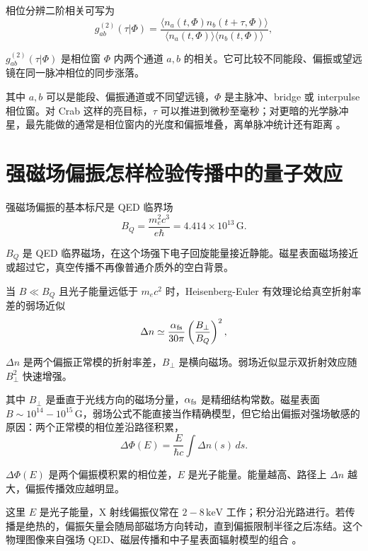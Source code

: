 相位分辨二阶相关可写为
\begin{equation}
  g^{(2)}_{ab}(\tau|\Phi)=
  \frac{\langle n_a(t,\Phi)n_b(t+\tau,\Phi)\rangle}
  {\langle n_a(t,\Phi)\rangle\langle n_b(t,\Phi)\rangle},
  \label{eq:ch11-16}
\end{equation}
\begin{formulaexplain}
\(g^{(2)}_{ab}(\tau|\Phi)\) 是相位窗 \(\Phi\) 内两个通道 \(a,b\) 的相关。它可比较不同能段、偏振或望远镜在同一脉冲相位的同步涨落。
\end{formulaexplain}
其中 \(a,b\) 可以是能段、偏振通道或不同望远镜，\(\Phi\) 是主脉冲、bridge 或 interpulse 相位窗。对 Crab 这样的亮目标，\(\tau\) 可以推进到微秒至毫秒；对更暗的光学脉冲星，最先能做的通常是相位窗内的光度和偏振堆叠，离单脉冲统计还有距离 \citep{1996ApJ...468..779M,2000ApJ...537..861S,2009MNRAS.397..103S}。

\section{强磁场偏振怎样检验传播中的量子效应}

强磁场偏振的基本标尺是 QED 临界场
\begin{equation}
  B_Q=\frac{m_e^2c^3}{e\hbar}
  =4.414\times10^{13}\,\mathrm{G}.
  \label{eq:ch11-17}
\end{equation}
\begin{formulaexplain}
\(B_Q\) 是 QED 临界磁场，在这个场强下电子回旋能量接近静能。磁星表面磁场接近或超过它，真空传播不再像普通介质外的空白背景。
\end{formulaexplain}
当 \(B\ll B_Q\) 且光子能量远低于 \(m_ec^2\) 时，Heisenberg-Euler 有效理论给真空折射率差的弱场近似
\begin{equation}
  \Delta n \simeq
  \frac{\alpha_{\rm fs}}{30\pi}
  \left(\frac{B_\perp}{B_Q}\right)^2 ,
  \label{eq:ch11-18}
\end{equation}
\begin{formulaexplain}
\(\Delta n\) 是两个偏振正常模的折射率差，\(B_\perp\) 是横向磁场。弱场近似显示双折射效应随 \(B_\perp^2\) 快速增强。
\end{formulaexplain}
其中 \(B_\perp\) 是垂直于光线方向的磁场分量，\(\alpha_{\rm fs}\) 是精细结构常数。磁星表面 \(B\sim10^{14}-10^{15}\,\mathrm{G}\)，弱场公式不能直接当作精确模型，但它给出偏振对强场敏感的原因：两个正常模的相位差沿路径积累，
\begin{equation}
  \Delta \Phi(E)=\frac{E}{\hbar c}\int \Delta n(s)\,ds .
  \label{eq:ch11-19}
\end{equation}
\begin{formulaexplain}
\(\Delta\Phi(E)\) 是两个偏振模积累的相位差，\(E\) 是光子能量。能量越高、路径上 \(\Delta n\) 越大，偏振传播效应越明显。
\end{formulaexplain}
这里 \(E\) 是光子能量，X 射线偏振仪常在 \(2-8\,\mathrm{keV}\) 工作；积分沿光路进行。若传播是绝热的，偏振矢量会随局部磁场方向转动，直到偏振限制半径之后冻结。这个物理图像来自强场 QED、磁层传播和中子星表面辐射模型的组合 \citep{1936ZPhy...98..714H,1971AnPhy..67..599A,2000MNRAS.311..555H,2002PhRvD..66b3002H,2003MNRAS.342..134H}。

